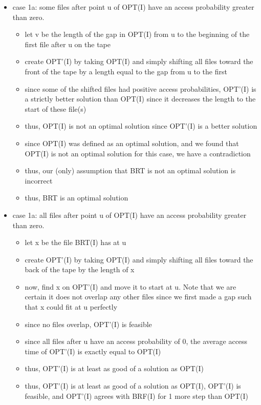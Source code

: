 \documentclass[a4paper]{article}
\begin{document}
\begin{itemize}
    \item case 1a: some files after point u of OPT(I) have an access probability greater than zero.
    \begin{itemize}
        \item let v be the length of the gap in OPT(I) from u to the beginning of the first file after u on the tape
        \item create OPT'(I) by taking OPT(I) and simply shifting all files toward the front of the tape by a length equal to the gap from u to the first
        \item since some of the shifted files had positive access probabilities, OPT'(I) is a strictly better solution than OPT(I) since it decreases the length to the start of these file(s)
        \item thus, OPT(I) is not an optimal solution since OPT'(I) is a better solution
        \item since OPT(I) was defined as an optimal solution, and we found that OPT(I) is not an optimal solution for this case, we have a contradiction
        \item thus, our (only) assumption that BRT is not an optimal solution is incorrect
        \item thus, BRT is an optimal solution
    \end{itemize}
    \item case 1a: all files after point u of OPT(I) have an access probability greater than zero.
    \begin{itemize}
        \item let x be the file BRT(I) has at u
        \item create OPT'(I) by taking OPT(I) and simply shifting all files toward the back of the tape by the length of x
        \item now, find x on OPT'(I) and move it to start at u. Note that we are certain it does not overlap any other files since we first made a gap such that x could fit at u perfectly
        \item since no files overlap, OPT'(I) is feasible
        \item since all files after u have an access probability of 0, the average access time of OPT'(I) is exactly equal to OPT(I)
        \item thus, OPT'(I) is at least as good of a solution as OPT(I)
        \item thus, OPT'(I) is at least as good of a solution as OPT(I), OPT'(I) is feasible, and OPT'(I) agrees with BRF(I) for 1 more step than OPT(I)

\end{itemize}
\end{itemize}
\end{document}
